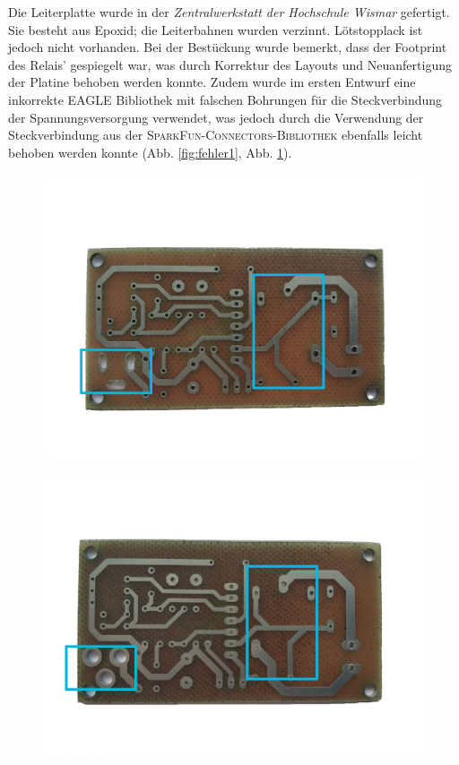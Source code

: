 \documentclass[a4paper, 12pt]{article}
\begin{document}
    Die Leiterplatte wurde in der \emph{Zentralwerkstatt der Hochschule Wismar} gefertigt. Sie besteht aus Epoxid; die Leiterbahnen wurden verzinnt. Lötstopplack ist jedoch nicht vorhanden. Bei der Bestückung wurde bemerkt, dass der Footprint des Relais' gespiegelt war, was durch Korrektur des Layouts und Neuanfertigung der Platine behoben werden konnte. Zudem wurde im ersten Entwurf eine inkorrekte EAGLE Bibliothek mit falschen Bohrungen für die Steckverbindung der Spannungsversorgung verwendet, was jedoch durch die Verwendung der Steckverbindung aus der \textsc{SparkFun-Connectors-Bibliothek} ebenfalls leicht behoben werden konnte (Abb. \ref{fig:fehler1}, Abb. \ref{fig:korr1}).\\

    \begin{figure}[H]
    \centering
      \begin{minipage}{.5\textwidth}
        \centering
        \includegraphics[width=.9\linewidth]{graphics/f2.png}
        \label{fig:fehler1}
      \end{minipage}%
      \begin{minipage}{.5\textwidth}
        \centering
        \includegraphics[width=.9\linewidth]{graphics/k3.png}
        \label{fig:korr1}
      \end{minipage}
    \end{figure}
\end{document}
